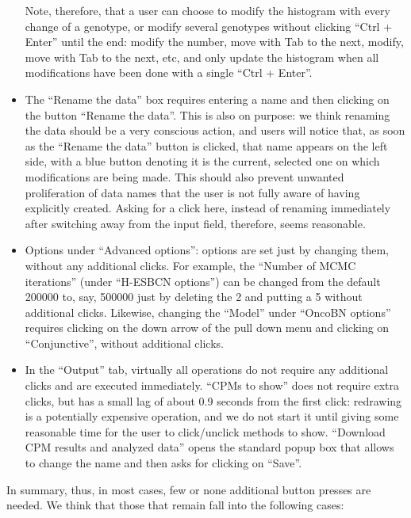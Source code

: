 \documentclass[a4paper,11pt]{article}
\begin{document}
\begin{itemize}
  Note, therefore, that a user can choose to modify the histogram with every change of a genotype, or modify several genotypes without clicking ``Ctrl + Enter'' until the end: modify the number,  move with Tab to the next, modify, move with Tab to the next, etc, and only update the histogram when all modifications have been done with a single ``Ctrl + Enter''.



\item The ``Rename the data'' box requires entering a name and then clicking on the button ``Rename the data''. This is also on purpose: we think renaming the data should be a very conscious action, and users will notice that, as soon as the ``Rename the data'' button is clicked, that name appears on the left side, with a blue button denoting it is the current, selected one on which modifications are being made. This should also prevent unwanted proliferation of data names that the user is not fully aware of having explicitly created.  Asking for a click here, instead of renaming immediately after switching away from the input field, therefore, seems reasonable. 

\item Options under ``Advanced options'': options are set just by changing them, without any additional clicks. For example, the ``Number of MCMC iterations'' (under ``H-ESBCN options'') can be changed from the default 200000 to, say, 500000 just by deleting the 2 and putting a 5 without additional clicks. Likewise, changing the ``Model'' under ``OncoBN options'' requires clicking on the down arrow of the pull down menu and clicking on ``Conjunctive'', without additional clicks.


\item In the ``Output'' tab, virtually all operations do not require any additional clicks and are executed immediately. ``CPMs to show'' does not require extra clicks, but has a small lag of about 0.9 seconds from the first click: redrawing is a potentially expensive operation, and we do not start it until giving some reasonable time for the user to click/unclick methods to show. ``Download CPM results and analyzed data'' opens the standard popup box that allows to change the name and then asks for clicking on ``Save''.
  
  
\end{itemize}



In summary, thus, in most cases, few or none additional button presses are needed. We think that those that remain fall into the following cases:
\end{document}
